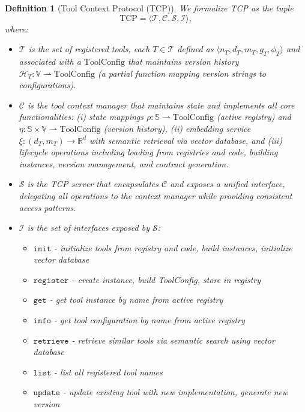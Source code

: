 \documentclass[11pt]{article}
\newtheorem{definition}{Definition}
\begin{document}
  \begin{definition}[Tool Context Protocol (TCP)]
  We formalize TCP as the tuple
  \[ \mathrm{TCP} = \langle \mathcal{T}, \mathcal{C}, \mathcal{S}, \mathcal{I} \rangle, \]
  where:
  \begin{itemize}[leftmargin=*,itemsep=0.1em]
    \item $\mathcal{T}$ is the set of registered tools, each $T \in \mathcal{T}$ defined as $\langle n_T, d_T, m_T, g_T, \phi_T \rangle$ and associated with a $\mathrm{ToolConfig}$ that maintains version history $\mathcal{H}_T: \mathbb{V} \rightharpoonup \mathrm{ToolConfig}$ (a partial function mapping version strings to configurations).
    \item $\mathcal{C}$ is the tool context manager that maintains state and implements all core functionalities: (i) state mappings $\rho: \mathbb{S} \rightharpoonup \mathrm{ToolConfig}$ (active registry) and $\eta: \mathbb{S} \times \mathbb{V} \rightharpoonup \mathrm{ToolConfig}$ (version history), (ii) embedding service $\xi: (d_T, m_T) \to \mathbb{R}^d$ with semantic retrieval via vector database, and (iii) lifecycle operations including loading from registries and code, building instances, version management, and contract generation.
    \item $\mathcal{S}$ is the TCP server that encapsulates $\mathcal{C}$ and exposes a unified interface, delegating all operations to the context manager while providing consistent access patterns.
    \item $\mathcal{I}$ is the set of interfaces exposed by $\mathcal{S}$:
    \begin{itemize}[leftmargin=*,itemsep=0.05em]
      \item $\mathtt{init}$ - initialize tools from registry and code, build instances, initialize vector database
      \item $\mathtt{register}$ - create instance, build ToolConfig, store in registry
      \item $\mathtt{get}$ - get tool instance by name from active registry
      \item $\mathtt{info}$ - get tool configuration by name from active registry
      \item $\mathtt{retrieve}$ - retrieve similar tools via semantic search using vector database
      \item $\mathtt{list}$ - list all registered tool names
      \item $\mathtt{update}$ - update existing tool with new implementation, generate new version

\end{itemize}
\end{itemize}
\end{definition}
\end{document}
